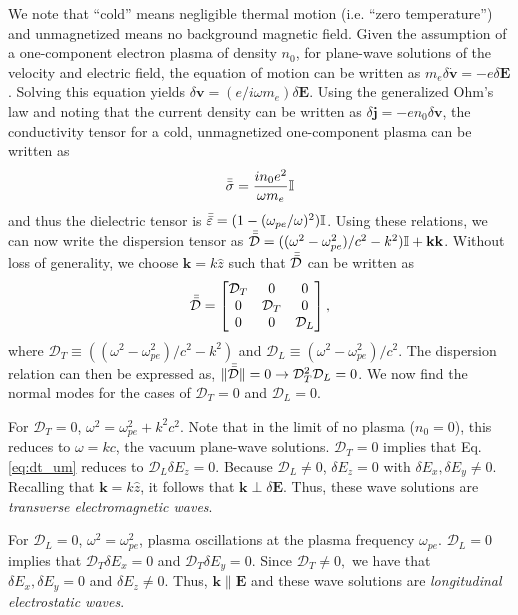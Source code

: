 	We note that ``cold'' means negligible thermal motion (i.e. ``zero temperature'') and unmagnetized means no background magnetic field. Given the assumption of a one-component electron plasma of density $n_0$, for plane-wave solutions of the velocity and electric field, the equation of motion can be written as $m_e\delta\dot{\mathbf{v}}=-e\delta\mathbf{E}$. Solving this equation yields $\delta\mathbf{v}=(e/i\omega m_e)\delta\mathbf{E}$. Using the generalized Ohm's law and noting that the current density can be written as $\delta\mathbf{j}=-en_0\delta\mathbf{v}$, the conductivity tensor for a cold, unmagnetized one-component plasma can be written as
	\begin{equation}
		\bar{\bar{\sigma}} = \frac{in_0e^2}{\omega m_e}\mathbb{I}
	\end{equation}
	and thus the dielectric tensor is $\bar{\bar{\varepsilon}} = (1-(\omega_{pe}/\omega)^2)\mathbb{I}$. Using these relations, we can now write the dispersion tensor as $\bar{\bar{\mathcal{D}}} = ((\omega^2 - \omega_{pe}^2)/c^2 - k^2)\mathbb{I} + \mathbf{kk}$. Without loss of generality, we choose $\mathbf{k}=k\hat{z}$ such that $\bar{\bar{\mathcal{D}}}$ can be written as
	\begin{equation}
		\label{eq:dt_um}
		\bar{\bar{\mathcal{D}}} = 
		\begin{bmatrix}
			\mathcal{D}_T & 0 & 0\\
			0 & \mathcal{D}_T & 0\\
			0 & 0 & \mathcal{D}_L\\
		\end{bmatrix}
		,
	\end{equation}
	where $\mathcal{D}_T\equiv((\omega^2 - \omega_{pe}^2)/c^2 - k^2)$ and $\mathcal{D}_L\equiv(\omega^2 - \omega_{pe}^2)/c^2$. The dispersion relation can then be expressed as, $\|\bar{\bar{\mathcal{D}}}\| = 0\rightarrow\mathcal{D}_T^2\mathcal{D}_L=0$. We now find the normal modes for the cases of $\mathcal{D}_T=0$ and $\mathcal{D}_L=0$.

	For $\mathcal{D}_T=0$,  $\omega^2=\omega_{pe}^2 + k^2c^2$. Note that in the limit of no plasma ($n_0=0$), this reduces to $\omega=kc$, the vacuum plane-wave solutions. $\mathcal{D}_T=0$ implies that Eq. \ref{eq:dt_um} reduces to $\mathcal{D}_L\delta E_z=0$. Because $\mathcal{D}_L\neq0$, $\delta E_z=0$ with $\delta E_x,\delta E_y\neq0$. Recalling that $\mathbf{k}=k\hat{z}$, it follows that $\mathbf{k}\perp\delta\mathbf{E}$. Thus, these wave solutions are \textit{transverse electromagnetic waves}.

	For $\mathcal{D}_L=0$, $\omega^2=\omega_{pe}^2$, plasma oscillations at the plasma frequency $\omega_{pe}$. $\mathcal{D}_L=0$ implies that $\mathcal{D}_T\delta E_x=0$ and $\mathcal{D}_T\delta E_y=0$. Since $\mathcal{D}_T\neq0,$ we have that $\delta E_x,\delta E_y=0$ and $\delta E_z\neq0$. Thus, $\mathbf{k}\parallel\mathbf{E}$ and these wave solutions are \textit{longitudinal electrostatic waves}.

